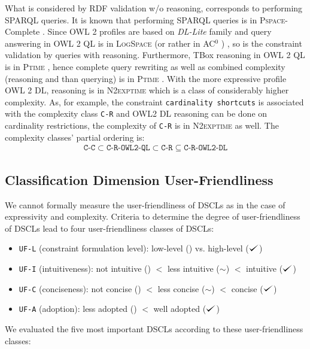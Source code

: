\documentclass{llncs}
\newcommand{\ms}[1]{\texttt{#1}}
\def\checkmark{\tikz\fill[scale=0.4](0,.35) -- (.25,0) -- (1,.7) -- (.25,.15) -- cycle;}
\begin{document}
What is considered by RDF validation w/o reasoning, corresponds to performing SPARQL queries.  It is known that performing SPARQL queries is in \textsc{Pspace}-Complete \cite{Perez2009}. Since OWL 2 profiles are based on \textit{DL-Lite} family and query answering in OWL 2 QL is in \textsc{LogSpace} (or rather in AC$^0$ ) \cite{Calvanese2007}, so is the constraint validation by queries with  reasoning. Furthermore, TBox reasoning in OWL 2 QL is in \textsc{Ptime} \cite{Calvanese2007}, hence complete query rewriting as well as combined complexity (reasoning and than querying) is in \textsc{Ptime} \cite{Artale2009,Calvanese2007}.  With the more expressive profile OWL 2 DL, reasoning is in \textsc{N2exptime} \cite{owl2profiles2008} which is a class of considerably higher complexity.
As, for example, the constraint \ms{cardinality shortcuts} is associated with the complexity class \ms{C-R} and OWL2 DL reasoning can be done on cardinality restrictions,
the complexity of \ms{C-R} is in \textsc{N2exptime} as well. 
The complexity classes' partial ordering is:
\begin{eqnarray*}
\ms{C-C} \subset \ms{C-R-OWL2-QL} \subset \ms{C-R} \subseteq \ms{C-R-OWL2-DL}
\end{eqnarray*}

\subsection{Classification Dimension User-Friendliness}

We cannot formally measure the user-friendliness of DSCLs as in the case of expressivity and complexity. 
Criteria to determine the degree of user-friendliness of DSCLs lead to four user-friendliness classes of DSCLs:

\begin{itemize}
	\item \ms{UF-L} (constraint formulation level): low-level () vs. high-level ($\checkmark$)
	\item \ms{UF-I} (intuitiveness): not intuitive () $<$ less intuitive ($\sim$) $<$ intuitive ($\checkmark$)
	\item \ms{UF-C} (conciseness): not concise () $<$ less concise ($\sim$) $<$ concise ($\checkmark$)
	\item \ms{UF-A} (adoption): less adopted () $<$ well adopted ($\checkmark$)
\end{itemize}

We evaluated the five most important DSCLs according to these user-friendliness classes:
\end{document}
